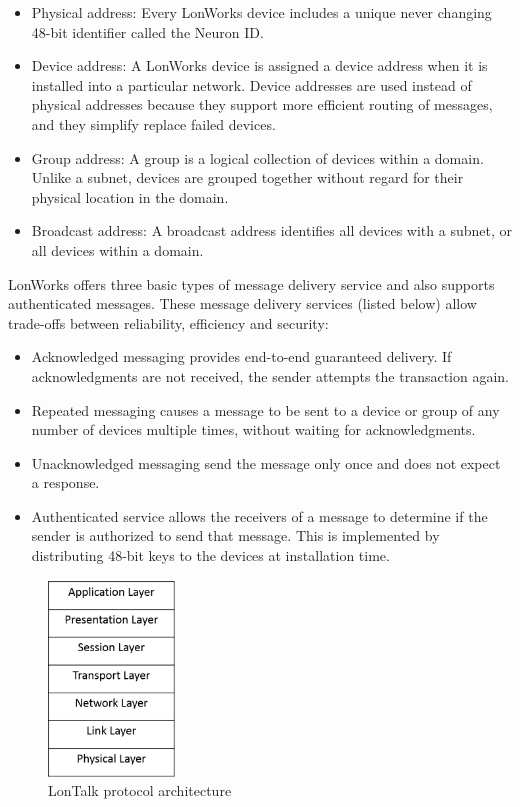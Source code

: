 \begin{itemize}
  \item Physical address: Every LonWorks device includes a unique never changing 48-bit identifier
called the Neuron ID.
  \item Device address: A LonWorks device is assigned a device address when it
is installed into a particular network. Device addresses are used instead
of physical addresses because they support more efficient routing of messages,
and they simplify replace failed devices.
  \item Group address: A group is a logical collection of devices within a domain.
Unlike a subnet, devices are grouped together without regard for their
physical location in the domain.
\item Broadcast address: A broadcast address identifies all devices with a subnet,
or all devices within a domain.
\end{itemize}

LonWorks offers three basic types of message delivery service and also supports authenticated messages. These message delivery services (listed below) allow trade-offs between reliability, efficiency and security:

\begin{itemize}
  \item Acknowledged messaging provides end-to-end guaranteed delivery. If acknowledgments are not received, the sender attempts the transaction again.
  \item Repeated messaging causes a message to be sent to a device or group of
any number of devices multiple times, without waiting for acknowledgments.
  \item Unacknowledged messaging send the message only once and does not expect a response.
  \item Authenticated service allows the receivers of a message to determine if the
sender is authorized to send that message. This is implemented by distributing 48-bit keys to the devices at installation time.
\end{itemize}


\begin{figure}[h]
\centering
\includegraphics[width=0.3\textwidth]{Figures/lon_table}
\caption{LonTalk protocol architecture}
\label{fig:lon}
\end{figure}




